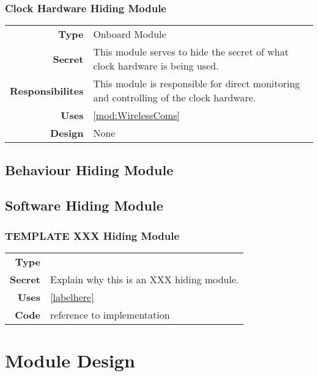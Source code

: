 \documentclass[10pt]{article}
\makeatletter
\newcommand{\CustomLabel}[1]{\Hy@raisedlink{\hypertarget{#1}{}}\label{#1}}
\makeatother
\begin{document}
    \subsubsection{Clock Hardware Hiding Module}\CustomLabel{mod:Clock}
        \begin{tabularx}{\linewidth}{ >{\bfseries}r X }
            Type            & Onboard Module \\
            Secret          & This module serves to hide the secret of what clock hardware is being used. \\
            Responsibilites & This module is responsible for direct monitoring and controlling of the clock hardware. \\
            Uses            & \ref{mod:WirelessComs} \\
            Design          & None \\
        \end{tabularx}
        
\subsection{Behaviour Hiding Module}


\subsection{Software Hiding Module}

    \subsubsection{ TEMPLATE XXX Hiding Module}\label{mod:TEMPLATE}
        \begin{tabularx}{\linewidth}{ >{\bfseries}r X }
            Type            &  \\
            Secret          & Explain why this is an XXX hiding module. \\
            Uses            & \ref{labelhere} \\ %
            Code            &  reference to implementation \\ %
        \end{tabularx}
        
\newpage




\section{Module Design}
\end{document}
